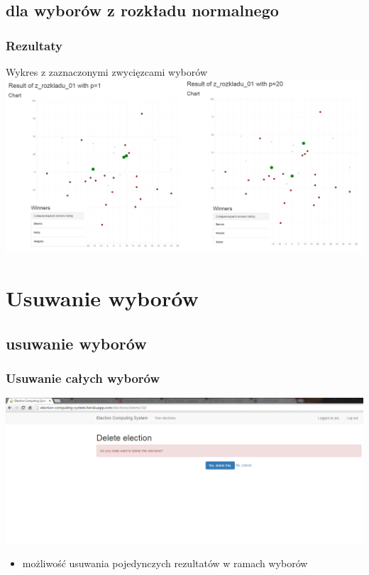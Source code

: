 \documentclass{beamer}
\begin{document}
\subsection{dla wyborów z rozkładu normalnego}
\begin{frame}
\frametitle{Rezultaty}
Wykres z zaznaczonymi zwycięzcami wyborów
\includegraphics[width=0.8\paperwidth]{screenshots/20_brute_norm_1_20.png}
\end{frame}

\section{Usuwanie wyborów}
\subsection{usuwanie wyborów}
\begin{frame}
\frametitle{Usuwanie całych wyborów}
\includegraphics[width=0.8\paperwidth]{screenshots/21_delete.png}
\begin{itemize}
\item możliwość usuwania pojedynczych rezultatów w ramach wyborów
\end{itemize}
\end{frame}
\end{document}
